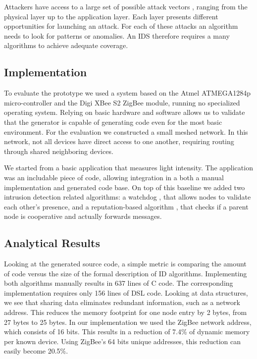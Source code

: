 \documentclass[3p,times,procedia]{elsarticle}
\begin{document}
Attackers have access to a large set of possible attack vectors
\cite{aschenbruck2012security}, ranging from the physical layer up to the
application layer. Each layer presents different opportunities for launching an
attack. For each of these attacks an algorithm needs to look for patterns or
anomalies. An IDS therefore requires a many algorithms to achieve adequate
coverage.

\vspace{-1mm}
\subsection{Implementation}

To evaluate the prototype we used a system based on the Atmel ATMEGA1284p
micro-controller and the Digi XBee S2 ZigBee module, running no specialized
operating system. Relying on basic hardware and software allows us to validate
that the generator is capable of generating code even for the most basic
environment. For the evaluation we constructed a small meshed network. In this
network, not all devices have direct access to one another, requiring routing
through shared neighboring devices.

We started from a basic application that measures light intensity. The
application was an includable piece of code, allowing integration in a both a
manual implementation and generated code base. On top of this baseline we added
two intrusion detection related algorithms: a watchdog
\cite{mishra2004intrusion}, that allows nodes to validate each other's
presence, and a reputation-based algorithm \cite{ganeriwal2008reputation}, that
checks if a parent node is cooperative and actually forwards messages.

\vspace{-1mm}
\subsection{Analytical Results}

Looking at the generated source code, a simple metric is comparing the amount
of code versus the size of the formal description of ID algorithms.
Implementing both algorithms manually results in 637 lines of C code. The
corresponding \FOO implementation requires only 156 lines of DSL code. Looking
at data structures, we see that sharing data eliminates redundant information,
such as a network address. This reduces the memory footprint for one node entry
by 2 bytes, from 27 bytes to 25 bytes. In our implementation we used the ZigBee
network address, which consists of 16 bits. This results in a reduction of
7.4\% of dynamic memory per known device. Using ZigBee's 64 bits unique
addresses, this reduction can easily become 20.5\%.
\end{document}
